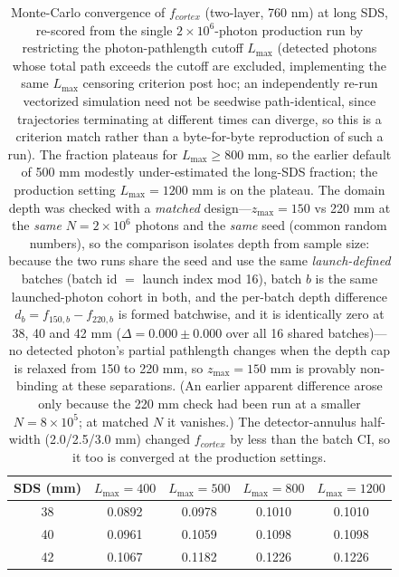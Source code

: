 \documentclass[11pt]{article}
\def\mathrm#1{#1}%
\def\,{ }%
\begin{document}
\begin{table}[ht]
\centering
\caption{Monte-Carlo convergence of $f_{\mathrm{cortex}}$ (two-layer, 760\,nm) at long SDS, re-scored from the single $2\times10^{6}$-photon production run by restricting the photon-pathlength cutoff $L_{\max}$ (detected photons whose total path exceeds the cutoff are excluded, implementing the same $L_{\max}$ censoring criterion post hoc; an independently re-run vectorized simulation need not be seedwise path-identical, since trajectories terminating at different times can diverge, so this is a criterion match rather than a byte-for-byte reproduction of such a run). The fraction plateaus for $L_{\max}\geq800$\,mm, so the earlier default of 500\,mm modestly under-estimated the long-SDS fraction; the production setting $L_{\max}=1200$\,mm is on the plateau. The domain depth was checked with a \emph{matched} design---$z_{\max}=150$ vs 220\,mm at the \emph{same} $N=2\times10^{6}$ photons and the \emph{same} seed (common random numbers), so the comparison isolates depth from sample size: because the two runs share the seed and use the same \emph{launch-defined} batches (batch id $=$ launch index mod 16), batch $b$ is the same launched-photon cohort in both, and the per-batch depth difference $d_b = f_{150,b}-f_{220,b}$ is formed batchwise, and it is identically zero at 38, 40 and 42\,mm ($\Delta=0.000\pm0.000$ over all 16 shared batches)---no detected photon's partial pathlength changes when the depth cap is relaxed from 150 to 220\,mm, so $z_{\max}=150$\,mm is provably non-binding at these separations. (An earlier apparent difference arose only because the 220\,mm check had been run at a smaller $N=8\times10^{5}$; at matched $N$ it vanishes.) The detector-annulus half-width (2.0/2.5/3.0\,mm) changed $f_{\mathrm{cortex}}$ by less than the batch CI, so it too is converged at the production settings.}
\label{tab:mc_conv}
\begin{tabular}{@{}ccccc@{}}
\toprule
\textbf{SDS (mm)} & $L_{\max}{=}400$ & $L_{\max}{=}500$ & $L_{\max}{=}800$ & $L_{\max}{=}1200$ \\
\midrule
38 & 0.0892 & 0.0978 & 0.1010 & 0.1010 \\
40 & 0.0961 & 0.1059 & 0.1098 & 0.1098 \\
42 & 0.1067 & 0.1182 & 0.1226 & 0.1226 \\
\bottomrule
\end{tabular}
\end{table}
\end{document}

